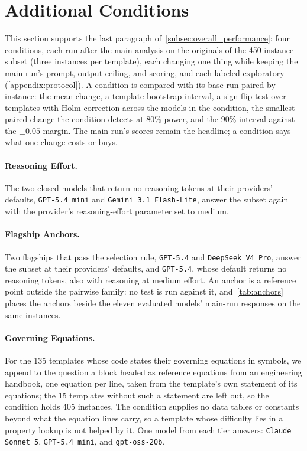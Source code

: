 \section{Additional Conditions}
\label{appendix:conditions}

This section supports the last paragraph of~\autoref{subsec:overall_performance}: four conditions,
each run after the main analysis on the originals of the 450-instance subset (three instances per
template), each changing one thing while keeping the main run's prompt, output ceiling, and scoring,
and each labeled exploratory (\autoref{appendix:protocol}).
A condition is compared with its base run paired by instance: the mean change, a template bootstrap
interval, a sign-flip test over templates with Holm correction across the models in the condition,
the smallest paired change the condition detects at 80\% power, and the 90\% interval against the
$\pm 0.05$ margin.
The main run's scores remain the headline; a condition says what one change costs or buys.

\paragraph{Reasoning Effort.}
The two closed models that return no reasoning tokens at their providers' defaults,
\texttt{GPT-5.4 mini} and \texttt{Gemini 3.1 Flash-Lite}, answer the subset again with the
provider's reasoning-effort parameter set to medium.

\paragraph{Flagship Anchors.}
Two flagships that pass the selection rule, \texttt{GPT-5.4} and \texttt{DeepSeek V4 Pro}, answer
the subset at their providers' defaults, and \texttt{GPT-5.4}, whose default returns no reasoning
tokens, also with reasoning at medium effort.
An anchor is a reference point outside the pairwise family: no test is run against it,
and~\autoref{tab:anchors} places the anchors beside the eleven evaluated models' main-run responses
on the same instances.

\paragraph{Governing Equations.}
For the 135 templates whose code states their governing equations in symbols, we append to the
question a block headed as reference equations from an engineering handbook, one equation per line,
taken from the template's own statement of its equations; the 15 templates without such a statement
are left out, so the condition holds 405 instances.
The condition supplies no data tables or constants beyond what the equation lines carry, so a
template whose difficulty lies in a property lookup is not helped by it.
One model from each tier answers: \texttt{Claude Sonnet 5}, \texttt{GPT-5.4 mini}, and
\texttt{gpt-oss-20b}.

